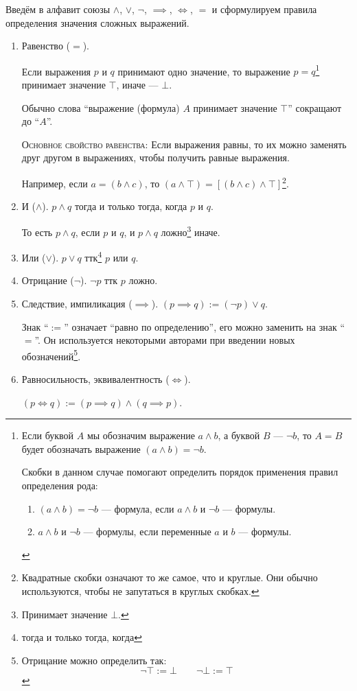Введём в алфавит союзы $\land$, $\lor$, $\lnot$, $\implies$, $\iff$, $=$
и сформулируем правила определения значения сложных выражений.
\begin{enumerate}
	\item{}Равенство ($=$).

	Если выражения $p$ и $q$ принимают одно значение,
	то выражение $p=q$\footnote[][-2cm]{
		Если буквой $A$ мы обозначим выражение $a\land b$,
		а буквой $B$ --- $\lnot b$, то $A=B$ будет обозначать выражение
		${(a\land b)=\lnot b}$.

		Скобки в данном случае помогают определить порядок
		применения правил определения рода:
		\begin{enumerate}
			\item{}${(a\land b)=\lnot b}$ --- формула,
			если $a\land b$ и $\lnot b$ --- формулы.
			\item{}$a\land b$ и $\lnot b$ --- формулы, если переменные $a$ и $b$ --- формулы.
		\end{enumerate}
	} принимает значение $\top$, иначе --- $\bot$.

	Обычно слова ``выражение (формула) $A$ принимает значение $\top$''
	сокращают до ``$A$''.

	\textsc{Основное свойство равенства:} Если выражения равны, то их можно
	заменять друг другом в выражениях, чтобы получить равные выражения.

	Например, если $a=(b\land c)$, то $(a\land\top)=[(b\land c)\land\top]$\footnote{
		Квадратные скобки означают то же самое,
		что и круглые. Они обычно используются, чтобы не запутаться в круглых скобках.
	}.

	\item{}И ($\land$). $p\land q$ тогда и только тогда, когда $p$ и $q$.

	То есть $p\land q$, если $p$ и $q$,
	и $p\land q$ ложно\footnote{Принимает значение $\bot$.} иначе.

	\item{}Или ($\lor$). $p\lor q$ ттк\footnote{тогда и только тогда, когда} $p$ или $q$.

	\item{}Отрицание ($\lnot$). $\lnot p$ ттк $p$ ложно.

	\item{}Следствие, импиликация ($\implies$). $(p\implies q):=(\lnot p)\lor q$.

	Знак ``$:=$'' означает ``равно по определению'', его можно заменить
	на знак ``$=$''. Он используется некоторыми авторами при введении новых
	обозначений\footnote{
		Отрицание можно определить так:
		\[
			\lnot\top:=\bot\qquad \lnot\bot:=\top
		\]
	}.

	\item{}Равносильность, эквивалентность ($\iff$).

	$(p\iff q):=(p\implies q)\land (q\implies p)$.
\end{enumerate}

